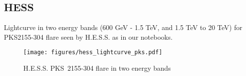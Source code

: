 \subsection{HESS}
\label{ssec:hess}

Lightcurve in two energy bands (600 GeV - 1.5 TeV, and 1.5 TeV to 20 TeV) for PKS2155-304 flare seen by H.E.S.S. as in our notebooks.

\begin{figure*}[t]
	\centering
	\texttt{[image: figures/hess\_lightcurve\_pks.pdf]}
	\caption{
		H.E.S.S. PKS~2155-304 flare in two energy bands}
	\label{fig:hess_lightcurve_pks}
\end{figure*}